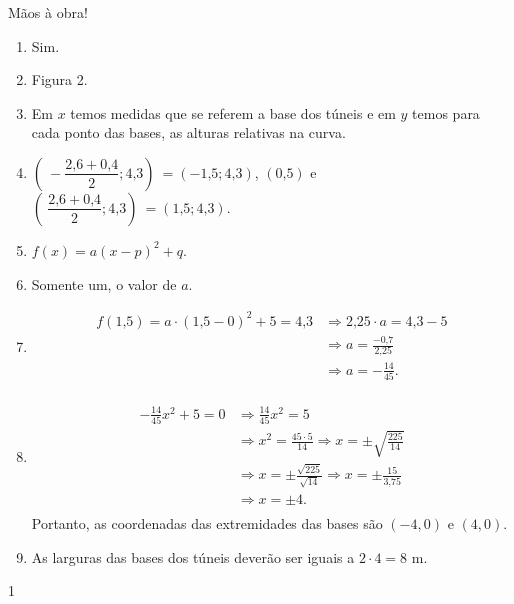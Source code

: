\clearmargin
\begin{answer}{Mãos à obra!}
{
\begin{enumerate}
\item {} 
Sim.

\item {} 
Figura 2.

\item {} 
Em \(x\) temos medidas que se referem a base dos túneis e em \(y\) temos para cada ponto das bases, as alturas relativas na curva.

\item {} 
\((\ -\dfrac{2\text{,}6+0\text{,}4}{2};4\text{,}3)\ = (-1\text{,}5;4\text{,}3)\), \((0\text{,}5)\) e \((\ \dfrac{2\text{,}6+0\text{,}4}{2};4\text{,}3)\ = (1\text{,}5;4\text{,}3)\).

\item {} 
\(f(x)=a(x-p)^2+q\).

\item {} 
Somente um, o valor de \(a\).

\item {} \begin{equation*}
\begin{split}f(1\text{,}5)= a \cdot (1\text{,}5-0)^2+5=4\text{,}3 
      & \Rightarrow 2\text{,}25 \cdot a = 4\text{,}3-5 \\
      & \Rightarrow a = \frac{-0\text{,}7}{2\text{,}25} \\
      & \Rightarrow a = - \frac{14}{45}. \\\end{split}
\end{equation*}
\item {} \begin{equation*}
\begin{split}- \frac{14}{45} x^2 + 5 = 0 & \Rightarrow \frac{14}{45} x^2 = 5 \\
& \Rightarrow x^2 = \frac{45 \cdot 5}{14} \Rightarrow x= \pm \sqrt{\frac{225}{14}} \\
& \Rightarrow x = \pm \frac{\sqrt{225}}{\sqrt{14}} \Rightarrow x = \pm \frac{15}{3\text{,}75} \\
& \Rightarrow x = \pm 4. \\\end{split}
\end{equation*}
Portanto, as coordenadas das extremidades das bases são \((-4,0)\) e \((4,0)\).

\item {} 
As larguras das bases dos túneis deverão ser iguais a \(2 \cdot 4 = 8\) m.

\end{enumerate}

}{1}
\end{answer}
\clearmargin

